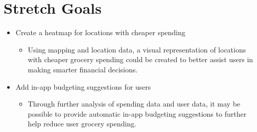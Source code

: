 \documentclass{article}
\begin{document}
\section{Stretch Goals}

\begin{itemize}
  \item Create a heatmap for locations with cheaper spending
  \begin{itemize}
    \item Using mapping and location data, a visual representation of locations with
    cheaper grocery spending could be created to better assist users in making smarter
    financial decisions.
  \end{itemize}  
  \item Add in-app budgeting suggestions for users
  \begin{itemize}
    \item Through further analysis of spending data and user data, it may be possible to provide 
    automatic in-app budgeting suggestions to further help reduce user grocery spending.
  \end{itemize}  
\end{itemize}  
\end{document}
